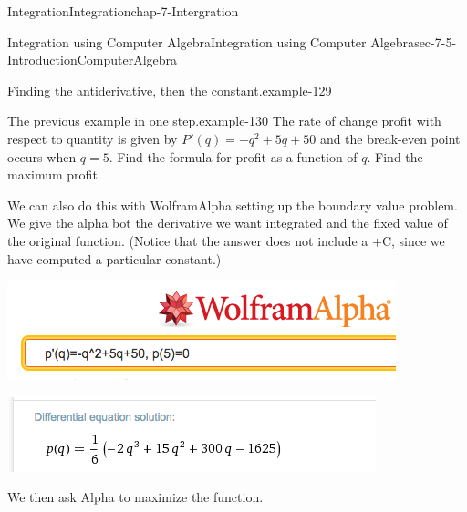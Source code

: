 \documentclass[oneside,10pt,]{book}
\numberwithin{equation}{section}
\begin{document}
\begin{chapterptx}{Integration}{}{Integration}{}{}{chap-7-Intergration}
\begin{sectionptx}{Integration using Computer Algebra}{}{Integration using Computer Algebra}{}{}{sec-7-5-IntroductionComputerAlgebra}
\begin{example}{Finding the antiderivative, then the constant.}{example-129}
\end{example}
\begin{example}{The previous example in one step.}{example-130}%
\hypertarget{p-2903}{}%
The rate of change profit with respect to quantity is given by \(P' (q)=-q^2+5q+50\) and the break-even point occurs when \(q=5\).  Find the formula for profit as a function of \(q\).  Find the maximum profit.%
\par
\hypertarget{p-2904}{}%
We can also do this with Wolfram\textbar{}Alpha setting up the boundary value problem.  We give the alpha bot the derivative we want integrated and the fixed value of the original function.  (Notice that the answer does not include a +C, since we have computed a particular constant.)%
\begin{sidebyside}{1}{0.15}{0.15}{0}%
\begin{sbspanel}{0.7}%
\includegraphics[width=1\linewidth]{images/sec7-5-17.png}
\end{sbspanel}%
\end{sidebyside}%
\begin{sidebyside}{1}{0.15}{0.15}{0}%
\begin{sbspanel}{0.7}%
\includegraphics[width=1\linewidth]{images/sec7-5-18.png}
\end{sbspanel}%
\end{sidebyside}%
\par
\hypertarget{p-2905}{}%
We then ask Alpha to maximize the function.%
\begin{sidebyside}{1}{0.05}{0.05}{0}%
\begin{sbspanel}{0.9}%

\end{sbspanel}
\end{sidebyside}
\end{example}
\end{sectionptx}
\end{chapterptx}
\end{document}
